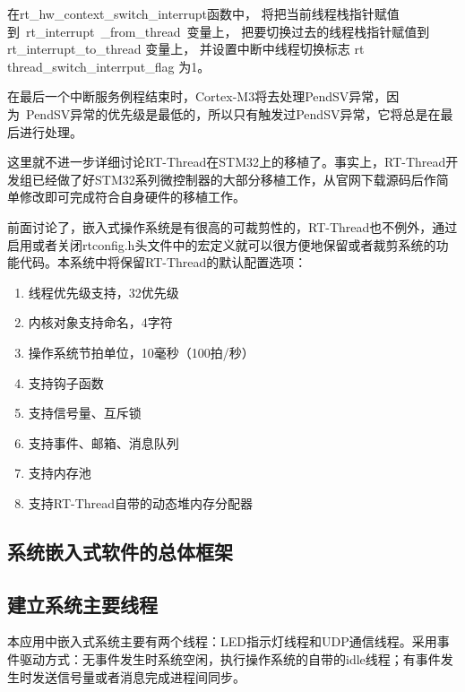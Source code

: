 在rt{\_}hw{\_}context{\_}switch{\_}interrupt函{\cf}数中{\cf}， {\cf}将把{\cf}当前{\cf}线程{\cf}栈指{\cf}针赋{\cf}值到~rt{\_}interrupt~{\_}from{\_}thread~变{\cf}量上{\cf}， {\cf}把要{\cf}切换{\cf}过去{\cf}的线{\cf}程栈{\cf}指针{\cf}赋值{\cf}到 rt{\_}interrupt{\_}to{\_}thread 变{\cf}量上{\cf}， {\cf}并设{\cf}置中{\cf}断中{\cf}线程{\cf}切换{\cf}标志{\cf} rt thread{\_}switch{\_}interrput{\_}flag 为1。

在{\cf}最后{\cf}一个{\cf}中断{\cf}服务{\cf}例程{\cf}结束{\cf}时，Cortex{\reg}-M3将{\cf}去处{\cf}理P{\cf}en{\cf}dS{\cf}V异{\cf}常，{\cf}因为~{\cf}Pe{\cf}nd{\cf}SV{\cf}异常{\cf}的优{\cf}先级{\cf}是最{\cf}低的{\cf}，所{\cf}以只{\cf}有触{\cf}发过{\cf}Pe{\cf}nd{\cf}SV{\cf}异常{\cf}，它{\cf}将总{\cf}是在{\cf}最后{\cf}进行{\cf}处理。

这里就不进一步详细讨论RT-Thread在STM32上的移植了。事实上，RT-Thread开发组已经做了好STM32系列微控制器的大部分移植工作，从官网下载源码后作简单修改即可完成符合自身硬件的移植工作。

前面讨论了，嵌入式操作系统是有很高的可裁剪性的，RT-Thread也不例外，通过启用或者关闭rtconfig.h头文件中的宏定义就可以很方便地保留或者裁剪系统的功能代码。本系统中将保留RT-Thread的默认配置选项：
\begin{enumerate}
\item 线程优先级支持，32优先级
\item 内核对象支持命名，4字符
\item 操作系统节拍单位，10毫秒（100拍/秒）
\item 支持钩子函数
\item 支持信号量、互斥锁
\item 支持事件、邮箱、消息队列
\item 支持内存池
\item 支持RT-Thread自带的动态堆内存分配器
\end{enumerate}

\subsection{系统嵌入式软件的总体框架}

\subsection{建立系统主要线程}
本应用中嵌入式系统主要有两个线程：LED指示灯线程和UDP通信线程。采用事件驱动方式：无事件发生时系统空闲，执行操作系统的自带的idle线程；有事件发生时发送信号量或者消息完成进程间同步。

